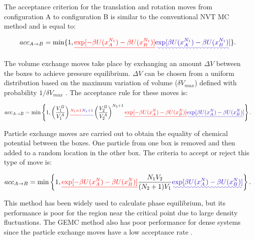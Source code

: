 \documentclass[
	12pt,				%
	openany,			%
	oneside,			%
	a4paper,			%
	english,			%
	brazil				%
	]{abntex2}
\providecommand{\DIFadd}[1]{{\protect\color{blue}\uwave{#1}}}
\providecommand{\DIFdel}[1]{{\protect\color{red}\sout{#1}}}
\providecommand{\DIFaddbegin}{}
\providecommand{\DIFaddend}{}
\providecommand{\DIFdelbegin}{}
\providecommand{\DIFdelend}{}
\providecommand{\DIFadd}[1]{{\protect\color{blue}\uwave{#1}}} %
\providecommand{\DIFdel}[1]{{\protect\color{red}\sout{#1}}}                      %
\providecommand{\DIFaddbegin}{} %
\providecommand{\DIFaddend}{} %
\providecommand{\DIFdelbegin}{} %
\providecommand{\DIFdelend}{} %
\begin{document}
The acceptance criterion for the translation and rotation moves from configuration A    to configuration B is similar to the conventional NVT MC method and is equal to:

\begin{equation}
acc_{A \rightarrow B} = \min \lbrace 1,\DIFdelbegin \DIFdel{\exp[-\beta U(x_{A}^{N_{1}}) -\beta U(x_{B}^{N_{1}})] }\DIFdelend \DIFaddbegin \DIFadd{\exp[\beta U(x_{A}^{N_{1}}) -\beta U(x_{B}^{N_{1}})] }\DIFaddend \rbrace .
\label{eqn:drprob}
\end{equation} 

The volume exchange moves take place by exchanging an amount $\Delta V$ between the boxes to achieve pressure equilibrium. $\Delta V$ can be chosen from a uniform distribution based on the maximum variation of volume ($\delta V_{max}$) defined with probability $1/\delta V_{max}$ \cite{frenkel}. The acceptance rule for these moves is: 

\begin{equation}
acc_{A \rightarrow B} = \min \left \lbrace 1, \left(\dfrac{V_{1}^{B}}{V_{1}^{A}} \right)\DIFdelbegin \DIFdel{^{N_{1}=1} }\DIFdelend \DIFaddbegin \DIFadd{^{N_{1}+1} }\DIFaddend \left( \dfrac{V_{2}^{B}}{V_{2}^{A}} \right)^{N_{2}+1} \DIFdelbegin \DIFdel{\exp[-\beta U(x_{A}^{N}) -\beta U(x_{B}^{N})] }\DIFdelend \DIFaddbegin \DIFadd{\exp[\beta U(x_{A}^{N}) -\beta U(x_{B}^{N})] }\DIFaddend \right \rbrace .
\label{vprob}
\end{equation}

Particle exchange moves are carried out to obtain the equality of chemical potential between the boxes. One particle from one box is removed and then added to a random location in the other box. The criteria to accept or reject this type of move is:

\begin{equation}
acc_{A \rightarrow B} = \min \left \lbrace 1, \DIFdelbegin %
\DIFdel{\exp[-\beta U(x_{A}^{N}) -\beta U(x_{B}^{N})] }\DIFdelend \DIFaddbegin \dfrac{N_{1}V_{2}}{(N_{2}+1)V_{1}}  \DIFadd{\exp[ \beta U(x_{A}^{N}) -\beta U(x_{B}^{N})] }\DIFaddend \right \rbrace .
\label{moleprob}
\end{equation}

This method has been widely used to calculate phase equilibrium, but its performance is poor for the region near the critical point due to large density fluctuations. The GEMC method also has poor performance for dense systems since the particle exchange moves have a low acceptance rate \cite{978-94-017-0765-7}.  
\end{document}
